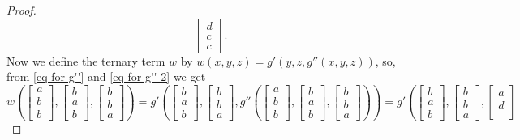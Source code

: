 \documentclass[11pt]{amsart}
\theoremstyle{definition}
\theoremstyle{remark}
\theoremstyle{plain}
\begin{document}
\begin{enumerate}[wide, labelindent=0pt]
\begin{enumerate}[wide, labelindent=0pt]
\begin{proof}
$$\begin{bmatrix}
d \\
c \\
c
\end{bmatrix}\!.
$$
Now we define the ternary term $w$ by $w(x,y,z)=g'(y,z,g''(x,y,z))$, so, from \eqref{eq for g''} and \eqref{eq for g'' 2} we get
 \begin{equation}\label{eq for w}
w\left(
\begin{bmatrix}
a \\
b \\
b
\end{bmatrix}\!,\!
\begin{bmatrix}
b \\
a \\
b
\end{bmatrix}\!,\!
\begin{bmatrix}
b \\
b \\
a
\end{bmatrix}
\right)=
g'\left(
\begin{bmatrix}
b \\
a \\
b
\end{bmatrix}\!,\!
\begin{bmatrix}
b \\
b \\
a
\end{bmatrix}\!,\!
g''\left(
\begin{bmatrix}
a \\
b \\
b
\end{bmatrix}\!,\!
\begin{bmatrix}
b \\
a \\
b
\end{bmatrix}\!,\!
\begin{bmatrix}
b \\
b \\
a
\end{bmatrix}
\right)
\right)=
g'\left(
\begin{bmatrix}
b \\
a \\
b
\end{bmatrix}\!,\!
\begin{bmatrix}
b \\
b \\
a
\end{bmatrix}\!,\!
\begin{bmatrix}
a \\
d \\

\end{bmatrix}
\end{equation}
\end{proof}
\end{enumerate}
\end{enumerate}
\end{document}
